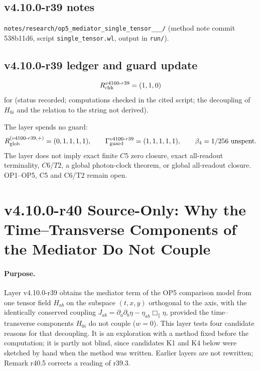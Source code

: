 \subsection*{v4.10.0-r39 notes}
\label{subsec:v4100-r39-notes}

\texttt{notes/\allowbreak research/\allowbreak op5\_\allowbreak mediator\_\allowbreak single\_\allowbreak tensor\_\_\_/} (method note commit 538b11d6,
script \texttt{single\_\allowbreak tensor.wl}, output in \texttt{run/}).

\subsection*{v4.10.0-r39 ledger and guard update}
\label{subsec:v4100-r39-ledger-guard}

\[
R_{\rm chk}^{v4100\text{-}r39}=(1,1,0)
\]
for (status recorded; computations checked in the cited script; the decoupling of \(H_{0i}\) and the relation to the string not derived).

The layer spends no guard:
\[
R_{\rm glob}^{(v4100\text{-}r39,+)}=(0,1,1,1,1),
\qquad
\Gamma_{\rm guard}^{v4100\text{-}r39}=(1,1,1,1,1),
\qquad
\beta_4=1/256\ \text{unspent}.
\]
The layer does not imply exact finite \(C5\) zero closure, exact all-readout terminality, \(C6/T2\), a global photon-clock theorem,
or global all-readout closure.  OP1--OP5, C5 and C6/T2 remain open.

\clearpage
\section*{v4.10.0-r40 Source-Only: Why the Time--Transverse Components of the Mediator Do Not Couple}
\label{sec:v4100-r40-h0i-decoupling}

\paragraph{Purpose.}
Layer v4.10.0-r39 obtains the mediator term of the OP5 comparison model from one tensor field \(H_{ab}\) on the subspace \((t,x,y)\) orthogonal to the
axis, with the identically conserved coupling \(J_{ab}=\partial_a\partial_b\eta-\eta_{ab}\Box_\parallel\eta\), provided the time--transverse components \(H_{0i}\)
do not couple (\(w=0\)).  This layer tests four candidate reasons for that decoupling.  It is an exploration with a method fixed before the
computation; it is partly not blind, since candidates K1 and K4 below were sketched by hand when the method was written.  Earlier layers are
not rewritten; Remark r40.5 corrects a reading of r39.3.

